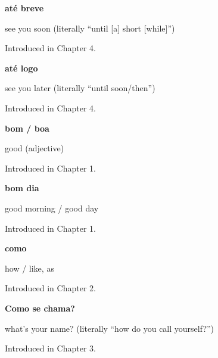 \noindent\begin{minipage}[t]{\linewidth}
\raggedright
\textbf{até breve}\par
\small see you soon (literally \textquotedblleft{}until {[}a{]} short {[}while{]}\textquotedblright{})\par
\footnotesize Introduced in Chapter 4.
\end{minipage}\par\medskip

\noindent\begin{minipage}[t]{\linewidth}
\raggedright
\textbf{até logo}\par
\small see you later (literally \textquotedblleft{}until soon/then\textquotedblright{})\par
\footnotesize Introduced in Chapter 4.
\end{minipage}\par\medskip

\noindent\begin{minipage}[t]{\linewidth}
\raggedright
\textbf{bom / boa}\par
\small good (adjective)\par
\footnotesize Introduced in Chapter 1.
\end{minipage}\par\medskip

\noindent\begin{minipage}[t]{\linewidth}
\raggedright
\textbf{bom dia}\par
\small good morning / good day\par
\footnotesize Introduced in Chapter 1.
\end{minipage}\par\medskip

\noindent\begin{minipage}[t]{\linewidth}
\raggedright
\textbf{como}\par
\small how / like, as\par
\footnotesize Introduced in Chapter 2.
\end{minipage}\par\medskip

\noindent\begin{minipage}[t]{\linewidth}
\raggedright
\textbf{Como se chama?}\par
\small what's your name? (literally \textquotedblleft{}how do you call yourself?\textquotedblright{})\par
\footnotesize Introduced in Chapter 3.
\end{minipage}\par\medskip

